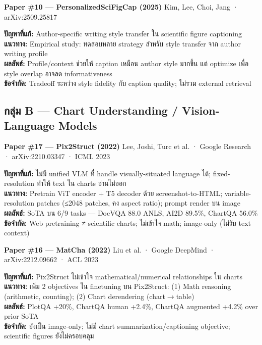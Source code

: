 \documentclass[10pt,a4paper]{article}
\begin{document}
\vspace{6pt}
\textbf{Paper \#10 — PersonalizedSciFigCap (2025)}
\hfill {\color{muted}\small Kim, Lee, Choi, Jang · arXiv:2509.25817}

\begin{infobox}
\textbf{ปัญหาที่แก้:} Author-specific writing style transfer ใน scientific figure captioning\\
\textbf{แนวทาง:} Empirical study: ทดสอบหลาย strategy สำหรับ style transfer จาก author writing profile\\
\textbf{ผลลัพธ์:} Profile/context ช่วยให้ caption เหมือน author style มากขึ้น แต่ optimize เพื่อ style overlap อาจลด informativeness\\
\textbf{ข้อจำกัด:} Tradeoff ระหว่าง style fidelity กับ caption quality; ไม่รวม external retrieval
\end{infobox}

\vspace{10pt}
\subsection*{\textcolor{accent-teal}{กลุ่ม B — Chart Understanding / Vision-Language Models}}

\textbf{Paper \#17 — Pix2Struct (2022)}
\hfill {\color{muted}\small Lee, Joshi, Turc et al. · Google Research · arXiv:2210.03347 · ICML 2023}

\begin{infobox}
\textbf{ปัญหาที่แก้:} ไม่มี unified VLM ที่ handle visually-situated language ได้; fixed-resolution ทำให้ text ใน charts อ่านไม่ออก\\
\textbf{แนวทาง:} Pretrain ViT encoder + T5 decoder ด้วย screenshot-to-HTML; variable-resolution patches (≤2048 patches, คง aspect ratio); prompt render บน image\\
\textbf{ผลลัพธ์:} SoTA บน 6/9 tasks — DocVQA 88.0 ANLS, AI2D 89.5\%, ChartQA 56.0\%\\
\textbf{ข้อจำกัด:} Web pretraining ≠ scientific charts; ไม่เข้าใจ math; image-only (ไม่รับ text context)
\end{infobox}

\vspace{6pt}
\textbf{Paper \#16 — MatCha (2022)}
\hfill {\color{muted}\small Liu et al. · Google DeepMind · arXiv:2212.09662 · ACL 2023}

\begin{infobox}
\textbf{ปัญหาที่แก้:} Pix2Struct ไม่เข้าใจ mathematical/numerical relationships ใน charts\\
\textbf{แนวทาง:} เพิ่ม 2 objectives ใน finetuning บน Pix2Struct: (1) Math reasoning (arithmetic, counting); (2) Chart derendering (chart$\rightarrow$table)\\
\textbf{ผลลัพธ์:} PlotQA +20\%, ChartQA human +2.4\%, ChartQA augmented +4.2\% over prior SoTA\\
\textbf{ข้อจำกัด:} ยังเป็น image-only; ไม่มี chart summarization/captioning objective; scientific figures ยังไม่ครอบคลุม
\end{infobox}
\end{document}
